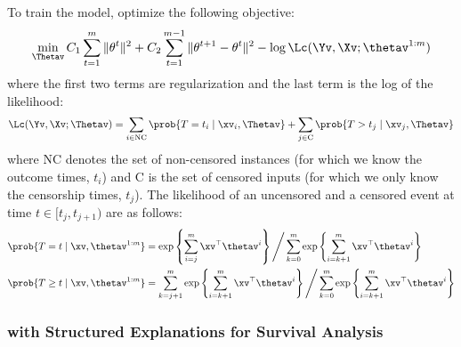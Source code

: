 \documentclass[twoside,11pt]{article}
\begin{document}
To train the model, \citet{lin2011learning} optimize the following objective:
\begin{equation}
    \label{eq:seq-dep-reg-objective}
    \min_{\Thetav} C_1\sum_{t=1}^m \|\theta^{t}\|^2 + C_2 \sum_{t=1}^{m-1} \|\theta^{t+1} - \theta^{t}\|^2 - \log \Lc(\Yv, \Xv; \thetav^{1:m})
\end{equation}
where the first two terms are regularization and the last term is the log of the likelihood:
\begin{equation}
    \label{eq:seq-dep-reg-likelihood}
    \Lc(\Yv, \Xv; \Thetav) = \sum_{i \in \text{NC}} \prob{T = t_i \mid \xv_i, \Thetav} + \sum_{j \in \text{C}} \prob{T > t_j \mid \xv_j, \Thetav}
\end{equation}
where $\text{NC}$ denotes the set of non-censored instances (for which we know the outcome times, $t_i$) and $\text{C}$ is the set of censored inputs (for which we only know the censorship times, $t_j$).
The likelihood of an uncensored and a censored event at time $t \in [t_j, t_{j+1})$ are as follows:\\[-2ex]
\begin{equation}
    \label{eq:uncensored-censored-likelihood}
    \begin{aligned}
        \prob{T = t \mid \xv, \thetav^{1:m}} & = \exp\left\{\sum_{i=j}^m \xv^\top \thetav^i\right\} \Bigg{/} \sum_{k=0}^m \exp\left\{\sum_{i=k+1}^m \xv^\top \thetav^i\right\} \\
        \prob{T \geq t \mid \xv, \thetav^{1:m}} & = \sum_{k=j+1}^m \exp\left\{\sum_{i=k+1}^m \xv^\top \thetav^i\right\}\Bigg{/} \sum_{k=0}^m \exp\left\{\sum_{i=k+1}^m \xv^\top \thetav^i\right\}
    \end{aligned}
\end{equation}


\subsubsection{{\CEN} with Structured Explanations for Survival Analysis}
\label{sec:survival-analysis-cen}
\end{document}
